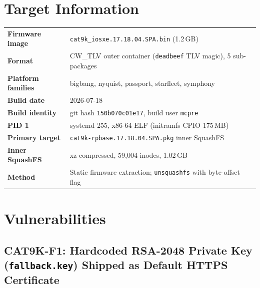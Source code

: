 \documentclass[11pt,a4paper]{article}
\begin{document}
\section{Target Information}

\begin{tabular}{@{} L{4.5cm} L{9.5cm} @{}}
\textbf{Firmware image}    & \texttt{cat9k\_iosxe.17.18.04.SPA.bin} (1.2\,GB) \\[0.4em]
\textbf{Format}            & CW\_TLV outer container (\texttt{deadbeef} TLV magic), 5 sub-packages \\[0.4em]
\textbf{Platform families} & bigbang, nyquist, passport, starfleet, symphony \\[0.4em]
\textbf{Build date}        & 2026-07-18 \\[0.4em]
\textbf{Build identity}    & git hash \texttt{150b070c01e17}, build user \texttt{mcpre} \\[0.4em]
\textbf{PID 1}             & systemd 255, x86-64 ELF (initramfs CPIO 175\,MB) \\[0.4em]
\textbf{Primary target}    & \texttt{cat9k-rpbase.17.18.04.SPA.pkg} inner SquashFS \\[0.4em]
\textbf{Inner SquashFS}    & xz-compressed, 59,004 inodes, 1.02\,GB \\[0.4em]
\textbf{Method}            & Static firmware extraction; \texttt{unsquashfs} with byte-offset flag \\
\end{tabular}

\section{Vulnerabilities}

\subsection{CAT9K-F1: Hardcoded RSA-2048 Private Key (\texorpdfstring{\texttt{fallback.key}}{fallback.key}) Shipped as Default HTTPS Certificate}
\end{document}
